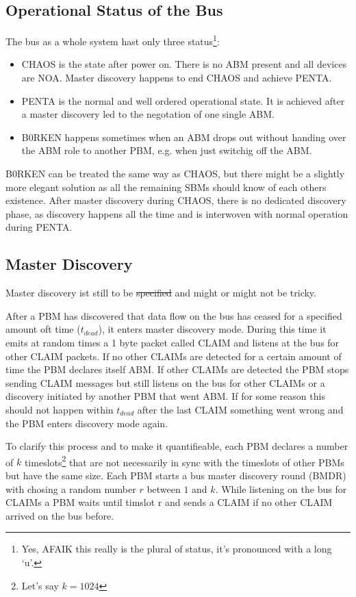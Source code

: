 \documentclass[a4paper,12pt]{scrartcl}
\begin{document}
\subsection{Operational Status of the Bus}
The bus as a whole system hast only three status\footnote{Yes, AFAIK this really is the plural of status, it's pronounced with a long `u'.}:
\begin{itemize}
 \item CHAOS is the state after power on. There is no ABM present and all devices are NOA. Master discovery happens to end CHAOS and achieve PENTA.
 \item PENTA is the normal and well ordered operational state. It is achieved after a master discovery led to the negotation of one single ABM.
 \item B0RKEN happens sometimes when an ABM drops out without handing over the ABM role to another PBM, e.g. when just switchig off the ABM.
\end{itemize}
B0RKEN can be treated the same way as CHAOS, but there might be a slightly more elegant solution as all the remaining SBMs should know of each others existence.
After master discovery during CHAOS, there is no dedicated discovery phase, as discovery happens all the time and is interwoven with normal operation during PENTA.

\subsection{Master Discovery}
Master discovery ist still to be \sout{specified}  and might or might not be tricky.


After a PBM has discovered that data flow on the bus has ceased for a specified amount oft time ($t_{dead}$),
it enters master discovery mode.
During this time it emits at random times a 1 byte packet called CLAIM and listens at the bus for other CLAIM packets.
If no other CLAIMs are detected for a certain amount of time the PBM declares itself ABM.
If other CLAIMs are detected the PBM stops sending CLAIM messages but still listens on the bus for other CLAIMs or a discovery initiated by another PBM that went ABM.
If for some reason this should not happen within $t_{dead}$ after the last CLAIM something went wrong and the PBM enters discovery mode again.

To clarify this process and to make it quantifieable, each PBM declares a number of
$k$ timeslots\footnote{Let's say $k=1024$} that are not necessarily in sync with the
timeslots of other PBMs but have the same size.
Each PBM starts a bus master discovery round (BMDR) with chosing a random number $r$ between $1$ and $k$.
While listening on the bus for CLAIMs a PBM waits until timslot r and sends a CLAIM if no other
CLAIM arrived on the bus before.
\end{document}
